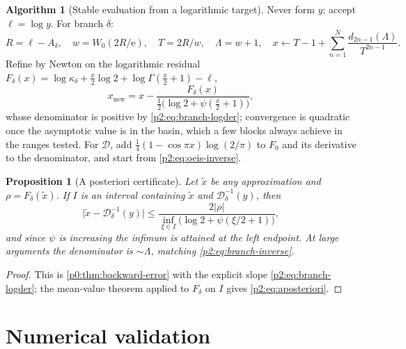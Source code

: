 \documentclass[11pt,a4paper,oneside]{book}
\theoremstyle{plain}
\newtheorem{proposition}[theorem]{Proposition}
\theoremstyle{definition}
\newtheorem{algorithm}[theorem]{Algorithm}
\theoremstyle{remark}
\newcommand{\e}{\mathrm{e}}
\newcommand{\Wlam}{W}
\begin{document}
\begin{algorithm}[Stable evaluation from a logarithmic target]
\label{p2:alg:evaluate}
Never form \(y\); accept \(\ell=\log y\).  For branch \(\delta\):
\begin{equation}
 R=\ell-A_\delta,
 \quad
 w=\Wlam_0(2R/\e),
 \quad
 T=2R/w,
 \quad
 \Lambda=w+1,
 \quad
 x\leftarrow T-1+\sum_{n=1}^{N}\frac{d_{2n-1}(\Lambda)}{T^{2n-1}} .
 \label{p2:eq:stable-eval}
\end{equation}
Refine by Newton on the logarithmic residual
\(F_\delta(x)=\log\kappa_\delta+\tfrac x2\log2+\log\Gamma(\tfrac x2+1)-\ell\),
\begin{equation}
 x_{\mathrm{new}}=x-\frac{F_\delta(x)}
 {\tfrac12\bigl(\log2+\psi(\tfrac x2+1)\bigr)},
 \label{p2:eq:newton}
\end{equation}
whose denominator is positive by \cref{p2:eq:branch-logder}; convergence is
quadratic once the asymptotic value is in the basin, which a few blocks always
achieve in the ranges tested.  For \(\mathscr D\), add
\(\tfrac14(1-\cos\pi x)\log(2/\pi)\) to \(F_0\) and its derivative to the
denominator, and start from \cref{p2:eq:oeis-inverse}.
\end{algorithm}

\begin{proposition}[A posteriori certificate]
\label{p2:prop:aposteriori}
Let \(\widetilde x\) be any approximation and \(\rho=F_\delta(\widetilde x)\).
If \(I\) is an interval containing \(\widetilde x\) and
\(\mathcal D_\delta^{-1}(y)\), then
\begin{equation}
 \bigl|\widetilde x-\mathcal D_\delta^{-1}(y)\bigr|
 \le\frac{2|\rho|}{\inf_{\xi\in I}\bigl(\log2+\psi(\xi/2+1)\bigr)} ,
 \label{p2:eq:aposteriori}
\end{equation}
and since \(\psi\) is increasing the infimum is attained at the left endpoint.
At large arguments the denominator is \(\sim\Lambda\), matching
\cref{p2:eq:branch-inverse}.
\end{proposition}

\begin{proof}
This is \cref{p0:thm:backward-error} with the explicit slope
\cref{p2:eq:branch-logder}; the mean-value theorem applied to \(F_\delta\) on
\(I\) gives \cref{p2:eq:aposteriori}.
\end{proof}

\section{Numerical validation}
\label{p2:sec:numerics}
\end{document}
